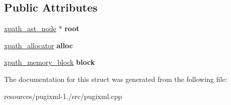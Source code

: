 \subsection*{Public Attributes}
\begin{DoxyCompactItemize}
\item 
\hypertarget{structxpath__query__impl_ad25499e0c8391005e3a1a60633d631fe}{\hyperlink{classxpath__ast__node}{xpath\+\_\+ast\+\_\+node} $\ast$ {\bfseries root}}\label{structxpath__query__impl_ad25499e0c8391005e3a1a60633d631fe}

\item 
\hypertarget{structxpath__query__impl_ae568b8642d48e729f2ccc2a50467c847}{\hyperlink{classxpath__allocator}{xpath\+\_\+allocator} {\bfseries alloc}}\label{structxpath__query__impl_ae568b8642d48e729f2ccc2a50467c847}

\item 
\hypertarget{structxpath__query__impl_a3a8af3ceed6a504567656ec6d1b62641}{\hyperlink{structxpath__memory__block}{xpath\+\_\+memory\+\_\+block} {\bfseries block}}\label{structxpath__query__impl_a3a8af3ceed6a504567656ec6d1b62641}

\end{DoxyCompactItemize}


The documentation for this struct was generated from the following file\+:\begin{DoxyCompactItemize}
\item 
resources/pugixml-\/1./src/pugixml.\+cpp\end{DoxyCompactItemize}
